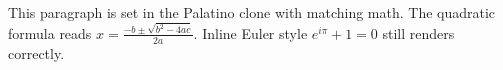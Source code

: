 \documentclass{article}
\begin{document}
This paragraph is set in the Palatino clone with matching math.
The quadratic formula reads $x = \frac{-b \pm \sqrt{b^2 - 4ac}}{2a}$.
Inline Euler style $e^{i\pi} + 1 = 0$ still renders correctly.
\end{document}
